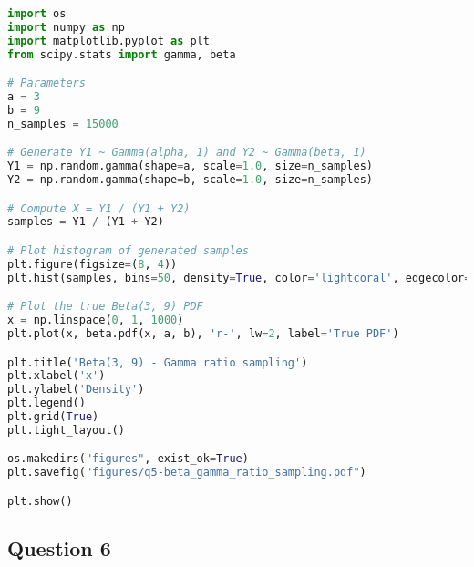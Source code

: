 \begin{lstlisting}[language=Python]
import os
import numpy as np
import matplotlib.pyplot as plt
from scipy.stats import gamma, beta

# Parameters
a = 3
b = 9
n_samples = 15000

# Generate Y1 ~ Gamma(alpha, 1) and Y2 ~ Gamma(beta, 1)
Y1 = np.random.gamma(shape=a, scale=1.0, size=n_samples)
Y2 = np.random.gamma(shape=b, scale=1.0, size=n_samples)

# Compute X = Y1 / (Y1 + Y2)
samples = Y1 / (Y1 + Y2)

# Plot histogram of generated samples
plt.figure(figsize=(8, 4))
plt.hist(samples, bins=50, density=True, color='lightcoral', edgecolor='black', alpha=0.7, label='Simulated (Gamma ratio)')

# Plot the true Beta(3, 9) PDF
x = np.linspace(0, 1, 1000)
plt.plot(x, beta.pdf(x, a, b), 'r-', lw=2, label='True PDF')

plt.title('Beta(3, 9) - Gamma ratio sampling')
plt.xlabel('x')
plt.ylabel('Density')
plt.legend()
plt.grid(True)
plt.tight_layout()

os.makedirs("figures", exist_ok=True)
plt.savefig("figures/q5-beta_gamma_ratio_sampling.pdf")

plt.show()
\end{lstlisting}




\newpage
\subsection{Question 6}

